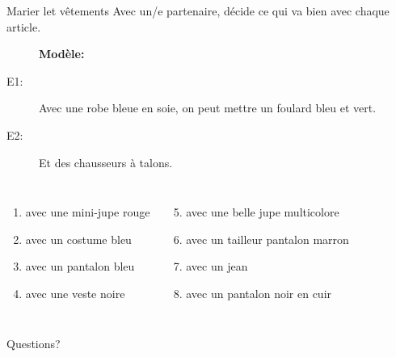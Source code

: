 \documentclass{beamer}
\begin{document}
  \begin{frame}{Marier let vêtements}
    Avec un/e partenaire, décide ce qui va bien avec chaque article. \\
    \begin{description}
      \item[] \textbf{Modèle:} 
      \item[E1:] Avec une robe bleue en soie, on peut mettre un foulard bleu et vert.
      \item[E2:] Et des chausseurs à talons.
    \end{description}
    \begin{columns}
        \begin{enumerate}
          \item avec une mini-jupe rouge
          \item avec un costume bleu
          \item avec un pantalon bleu
          \item avec une veste noire
        \end{enumerate}
        \begin{enumerate}
          \setcounter{enumi}{4}
          \item avec une belle jupe multicolore
          \item avec un tailleur pantalon marron
          \item avec un jean
          \item avec un pantalon noir en cuir
        \end{enumerate}
    \end{columns}
  \end{frame}

  \begin{frame}{}
    \begin{center}
      \Large Questions?
    \end{center}
  \end{frame}
\end{document}
